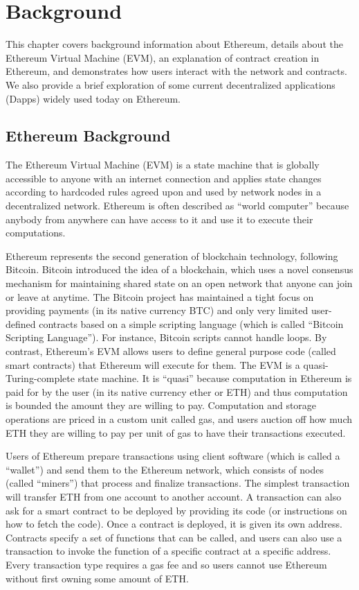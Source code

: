 
\chapter{Background}
\label{chap:background}
This chapter covers background information about Ethereum, details about the Ethereum Virtual Machine (EVM), an explanation of contract creation in Ethereum, and demonstrates how users interact with the network and contracts. We also provide a brief exploration of some current decentralized applications (Dapps) widely used today on Ethereum.
 
\section{Ethereum Background}

The Ethereum Virtual Machine (EVM) is a state machine that is globally accessible to anyone with an internet connection and applies state changes according to hardcoded rules agreed upon and used by network nodes in a decentralized network. Ethereum is often described as ``world computer'' because anybody from anywhere can have access to it and use it to execute their computations. 

Ethereum represents the second generation of blockchain technology, following Bitcoin. Bitcoin introduced the idea of a blockchain, which uses a novel consensus mechanism for maintaining shared state on an open network that anyone can join or leave at anytime. The Bitcoin project has maintained a tight focus on providing payments (in its native currency BTC) and only very limited user-defined contracts based on a simple scripting language (which is called ``Bitcoin Scripting Language''). For instance, Bitcoin scripts cannot handle loops. By contrast, Ethereum's EVM allows users to define general purpose code (called smart contracts) that Ethereum will execute for them.  The EVM is a quasi-Turing-complete state machine. It is ``quasi'' because computation in Ethereum is paid for by the user (in its native currency ether or ETH) and thus computation is bounded the amount they are willing to pay. Computation and storage operations are priced in a custom unit called gas, and users auction off how much ETH they are willing to pay per unit of gas to have their transactions executed.

Users of Ethereum prepare transactions using client software (which is called a ``wallet'') and send them to the Ethereum network, which consists of nodes (called ``miners'') that process and finalize transactions. The simplest transaction will transfer ETH from one account to another account. A transaction can also ask for a smart contract to be deployed by providing its code (or instructions on how to fetch the code). Once a contract is deployed, it is given its own address. Contracts specify a set of functions that can be called, and users can also use a transaction to invoke the function of a specific contract at a specific address. Every transaction type requires a gas fee and so users cannot use Ethereum without first owning some amount of ETH. 

